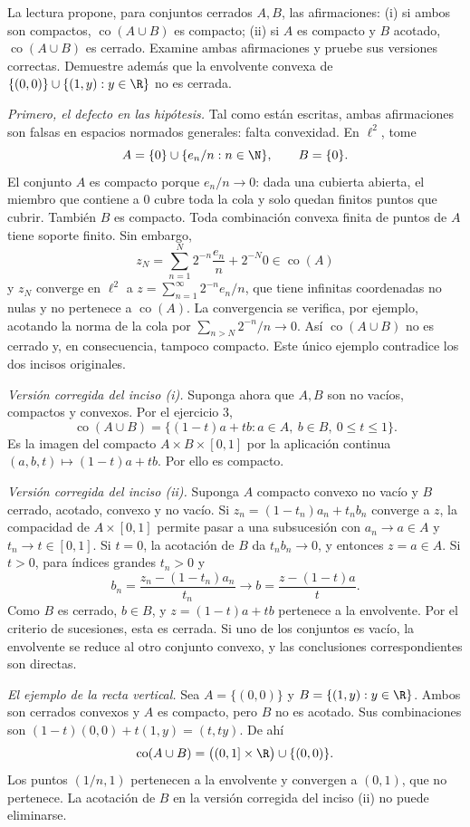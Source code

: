 \begin{ejercicio}
La lectura propone, para conjuntos cerrados $A,B$, las afirmaciones: (i) si ambos son compactos, $\operatorname{co}(A\cup B)$ es compacto; (ii) si $A$ es compacto y $B$ acotado, $\operatorname{co}(A\cup B)$ es cerrado. Examine ambas afirmaciones y pruebe sus versiones correctas. Demuestre además que la envolvente convexa de $\{(0,0)\}\cup\{(1,y):y\in\R\}$ no es cerrada.
\end{ejercicio}
\begin{solucion}
\emph{Primero, el defecto en las hipótesis.} Tal como están escritas, ambas afirmaciones son falsas en espacios normados generales: falta convexidad. En $\ell^2$, tome
\[
 A=\{0\}\cup\{e_n/n:n\in\N\},\qquad B=\{0\}.
\]
El conjunto $A$ es compacto porque $e_n/n\to0$: dada una cubierta abierta, el miembro que contiene a $0$ cubre toda la cola y solo quedan finitos puntos que cubrir. También $B$ es compacto. Toda combinación convexa finita de puntos de $A$ tiene soporte finito. Sin embargo,
\[
 z_N=\sum_{n=1}^N2^{-n}\frac{e_n}{n}+2^{-N}0
 \in\operatorname{co}(A)
\]
y $z_N$ converge en $\ell^2$ a $z=\sum_{n=1}^{\infty}2^{-n}e_n/n$, que tiene infinitas coordenadas no nulas y no pertenece a $\operatorname{co}(A)$. La convergencia se verifica, por ejemplo, acotando la norma de la cola por $\sum_{n>N}2^{-n}/n\to0$. Así $\operatorname{co}(A\cup B)$ no es cerrado y, en consecuencia, tampoco compacto. Este único ejemplo contradice los dos incisos originales.

\emph{Versión corregida del inciso (i).} Suponga ahora que $A,B$ son no vacíos, compactos y convexos. Por el ejercicio 3,
\[
 \operatorname{co}(A\cup B)
 =\{(1-t)a+tb:a\in A,\ b\in B,\ 0\leq t\leq1\}.
\]
Es la imagen del compacto $A\times B\times[0,1]$ por la aplicación continua $(a,b,t)\mapsto(1-t)a+tb$. Por ello es compacto.

\emph{Versión corregida del inciso (ii).} Suponga $A$ compacto convexo no vacío y $B$ cerrado, acotado, convexo y no vacío. Si $z_n=(1-t_n)a_n+t_nb_n$ converge a $z$, la compacidad de $A\times[0,1]$ permite pasar a una subsucesión con $a_n\to a\in A$ y $t_n\to t\in[0,1]$. Si $t=0$, la acotación de $B$ da $t_nb_n\to0$, y entonces $z=a\in A$. Si $t>0$, para índices grandes $t_n>0$ y
\[
 b_n=\frac{z_n-(1-t_n)a_n}{t_n}
 \longrightarrow b=\frac{z-(1-t)a}{t}.
\]
Como $B$ es cerrado, $b\in B$, y $z=(1-t)a+tb$ pertenece a la envolvente. Por el criterio de sucesiones, esta es cerrada. Si uno de los conjuntos es vacío, la envolvente se reduce al otro conjunto convexo, y las conclusiones correspondientes son directas.

\emph{El ejemplo de la recta vertical.} Sea $A=\{(0,0)\}$ y $B=\{(1,y):y\in\R\}$. Ambos son cerrados convexos y $A$ es compacto, pero $B$ no es acotado. Sus combinaciones son $(1-t)(0,0)+t(1,y)=(t,ty)$. De ahí
\[
 \operatorname{co}(A\cup B)
 =\bigl((0,1]\times\R\bigr)\cup\{(0,0)\}.
\]
Los puntos $(1/n,1)$ pertenecen a la envolvente y convergen a $(0,1)$, que no pertenece. La acotación de $B$ en la versión corregida del inciso (ii) no puede eliminarse.
\end{solucion}

